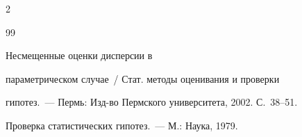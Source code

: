 \begin{multicols}{2}
{{\begin{thebibliography}{99}






Несмещенные оценки дисперсии в


параметрическом случае~/ Стат. методы оценивания и проверки


гипотез.~--- Пермь: Изд-во Пермского университета, 2002. С.~38--51. %






\label{end\stat}


Проверка статистических гипотез.~--- М.: Наука, 1979.


\end{thebibliography}





}


}


\end{multicols}


